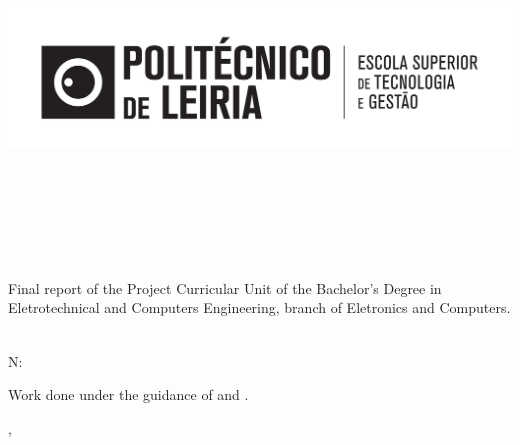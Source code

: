 
\begin{titlepage}

\begin{center}

\hfill

\includegraphics[width=\textwidth]{Covers/estg_h.pdf} \\

\bigskip
\large
\myFaculty \\
\mySchool \\ 
\myDepartment \\
\myDegree \\



\begingroup
\color{Maroon}

\vspace{2cm}

\spacedallcaps{\myTitle} \\ \bigskip %
\endgroup

\vspace{1cm}


\noindent Final report of the Project Curricular Unit of the Bachelor’s Degree in Eletrotechnical and Computers Engineering, branch of Eletronics and Computers.

\vspace{1cm}

\spacedlowsmallcaps{\myNameOne}\\
N: \myNumber \\
\bigskip %

\vfill

\end{center}

\begin{normalsize}
    
\noindent Work done under the guidance of \myProfOne \ProfLuisEmail and \myProfTwo \ProfMonicaEmail.

\end{normalsize}
\vfill

\begin{center}

\myLocation, \myTime\ %
    
\end{center}




\end{titlepage}

\cleardoublepage